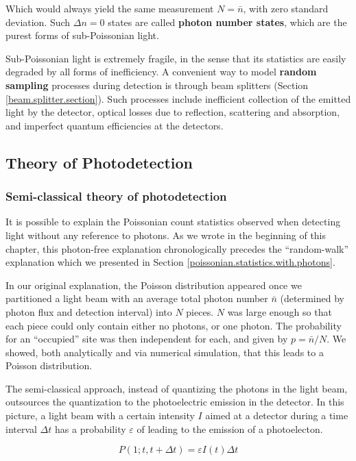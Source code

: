 \documentclass[12pt,a4paper]{report}
\begin{document}
Which would always yield the same measurement $N=\bar{n}$, with zero standard deviation. Such $\Delta n =0$ states are called \textbf{photon number states}, which are the purest forms of sub-Poissonian light.

Sub-Poissonian light is extremely fragile, in the sense that its statistics are easily degraded by all forms of inefficiency. A convenient way to model \textbf{random sampling} processes during detection is through beam splitters (Section \ref{beam.splitter.section}). Such processes include inefficient collection of the emitted light by the detector, optical losses due to reflection, scattering and absorption, and imperfect quantum efficiencies at the detectors.


\subsection{Theory of Photodetection}

\subsubsection{Semi-classical theory of photodetection}

It is possible to explain the Poissonian count statistics observed when detecting light without any reference to photons. As we wrote in the beginning of this chapter, this photon-free explanation chronologically precedes the ``random-walk'' explanation which we presented in Section \ref{poissonian.statistics.with.photons}.

In our original explanation, the Poisson distribution appeared once we partitioned a light beam with an average total photon number $\bar{n}$ (determined by photon flux and detection interval) into $N$ pieces. $N$ was large enough so that each piece could only contain either no photons, or one photon. The probability for an ``occupied'' site was then independent for each, and given by $p=\bar{n}/N$. We showed, both analytically and via numerical simulation, that this leads to a Poisson distribution.

The semi-classical approach, instead of quantizing the photons in the light beam, outsources the quantization to the photoelectric emission in the detector. In this picture, a light beam with a certain intensity $I$ aimed at a detector during a time interval $\Delta t$ has a probability $\varepsilon$ of leading to the emission of a photoelecton.

\begin{equation}
    P(1;t,t+\Delta t)=\varepsilon I(t)\Delta t
\end{equation}
\end{document}
